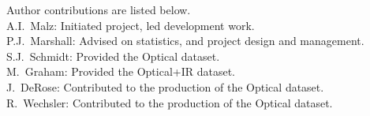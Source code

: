 Author contributions are listed below. \\
A.I.~Malz: Initiated project, led development work. \\
P.J.~Marshall: Advised on statistics, and project design and management. \\
S.J.~Schmidt: Provided the Optical dataset. \\
M.~Graham: Provided the Optical+IR dataset. \\
J.~DeRose: Contributed to the production of the Optical dataset. \\
R.~Wechsler: Contributed to the production of the Optical dataset. \\
